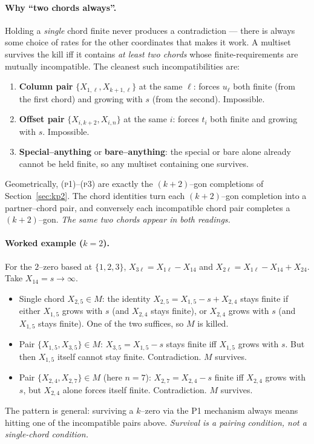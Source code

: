\documentclass[11pt]{article}
\theoremstyle{definition}
\newcommand{\X}[1]{X_{#1}}
\begin{document}
\paragraph{Why ``two chords always''.}
Holding a \emph{single} chord finite never produces a contradiction --- there is always some choice
of rates for the other coordinates that makes it work. A multiset survives the kill iff it contains
\emph{at least two chords} whose finite-requirements are mutually incompatible. The cleanest such
incompatibilities are:
\begin{enumerate}[label=(\textsc{p\arabic*}),topsep=2pt,itemsep=1pt]
  \item \textbf{Column pair} $\{\X{1,\ell},\X{k+1,\ell}\}$ at the same $\ell$:
        forces $u_\ell$ both finite (from the first chord) and growing with $s$ (from the second).
        Impossible.
  \item \textbf{Offset pair} $\{\X{i,k+2},\X{i,n}\}$ at the same $i$:
        forces $t_i$ both finite and growing with $s$. Impossible.
  \item \textbf{Special--anything} or \textbf{bare--anything}: the special or bare alone already
        cannot be held finite, so any multiset containing one survives.
\end{enumerate}
Geometrically, (\textsc{p1})--(\textsc{p3}) are exactly the $(k{+}2)$--gon completions of
Section~\ref{sec:kp2}. The chord identities turn each $(k{+}2)$--gon completion into a
partner--chord pair, and conversely each incompatible chord pair completes a $(k{+}2)$--gon.
\emph{The same two chords appear in both readings.}

\paragraph{Worked example ($k=2$).}
For the $2$--zero based at $\{1,2,3\}$, $\X{3\ell}=\X{1\ell}-\X{14}$ and
$\X{2\ell}=\X{1\ell}-\X{14}+\X{24}$. Take $\X{14}=s\to\infty$.
\begin{itemize}[topsep=2pt,itemsep=1pt]
  \item Single chord $\X{2,5}\in M$: the identity $\X{2,5}=\X{1,5}-s+\X{2,4}$ stays finite if either
  $\X{1,5}$ grows with $s$ (and $\X{2,4}$ stays finite), or $\X{2,4}$ grows with $s$ (and
  $\X{1,5}$ stays finite). One of the two suffices, so $M$ is killed.
  \item Pair $\{\X{1,5},\X{3,5}\}\in M$: $\X{3,5}=\X{1,5}-s$ stays finite iff $\X{1,5}$ grows with
  $s$. But then $\X{1,5}$ itself cannot stay finite. Contradiction. $M$ survives.
  \item Pair $\{\X{2,4},\X{2,7}\}\in M$ (here $n=7$): $\X{2,7}=\X{2,4}-s$ finite iff $\X{2,4}$ grows
  with $s$, but $\X{2,4}$ alone forces itself finite. Contradiction. $M$ survives.
\end{itemize}
The pattern is general: surviving a $k$--zero via the P1 mechanism always means hitting one of the
incompatible pairs above. \emph{Survival is a pairing condition, not a single-chord condition.}
\end{document}
